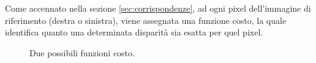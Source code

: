 \documentclass[12pt]{report}
\begin{document}
		Come accennato nella sezione \ref{sec:corrispondenze}, ad ogni pixel dell'immagine di riferimento (destra o sinistra), viene assegnata una funzione costo, la quale identifica quanto una determinata disparità sia esatta per quel pixel.
			
			
		\begin{figure}[<h>]
			\centering
			 \quad
			\caption{Due possibili funzioni costo.}
			\label{fig:costi}
		\end{figure}	
		
\end{document}
